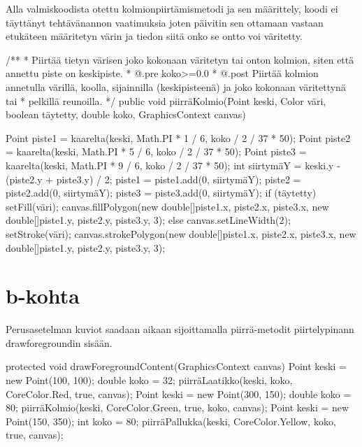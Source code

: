Alla valmiskoodista otettu kolmionpiirtämismetodi ja sen määrittely, koodi ei
täyttänyt tehtävänannon vaatimuksia joten päivitin sen ottamaan vastaan etukäteen
määritetyn värin ja tiedon siitä onko se ontto voi väritetty.
\begin{javacode}
/**
* Piirtää tietyn värisen joko kokonaan väritetyn tai onton kolmion, siten että annettu
piste on keskipiste.
* @.pre koko>=0.0
* @.post Piirtää kolmion annetulla värillä, koolla, sijainnilla (keskipisteenä) ja
  joko kokonaan väritettynä tai
* pelkillä reunoilla.
*/
    public void piirräKolmio(Point keski, Color väri, boolean täytetty, double koko,
    GraphicsContext canvas) {
        Point piste1 = kaarelta(keski, Math.PI * 1 / 6, koko / 2 / 37 * 50);
        Point piste2 = kaarelta(keski, Math.PI * 5 / 6, koko / 2 / 37 * 50);
        Point piste3 = kaarelta(keski, Math.PI * 9 / 6, koko / 2 / 37 * 50);
        int siirtymäY = keski.y - (piste2.y + piste3.y) / 2;
        piste1 = piste1.add(0, siirtymäY);
        piste2 = piste2.add(0, siirtymäY);
        piste3 = piste3.add(0, siirtymäY);
    if (täytetty){
      setFill(väri);
      canvas.fillPolygon(new double[]{piste1.x, piste2.x, piste3.x}, new
      double[]{piste1.y, piste2.y, piste3.y}, 3);
    } else{
      canvas.setLineWidth(2);
            setStroke(väri);
            canvas.strokePolygon(new double[]{piste1.x, piste2.x, piste3.x},
            new double[]{piste1.y, piste2.y, piste3.y}, 3);
    }
        
    }
\end{javacode}

\section{b-kohta}
\label{b-kohta}
Perusasetelman kuviot saadaan aikaan sijoittamalla piirrä-metodit piirtelypinann
drawforegroundin sisään.
\begin{javacode}
    protected void drawForegroundContent(GraphicsContext canvas) {
        {
            Point keski = new Point(100, 100);
            double koko = 32;
            piirräLaatikko(keski, koko, CoreColor.Red, true, canvas);
        }
        {
            Point keski = new Point(300, 150);
            double koko = 80;
            piirräKolmio(keski, CoreColor.Green, true, koko, canvas);
        }
        {
            Point keski = new Point(150, 350);
            int koko = 80; 
            piirräPallukka(keski, CoreColor.Yellow, koko, true, canvas);
        }
    }
\end{javacode}

